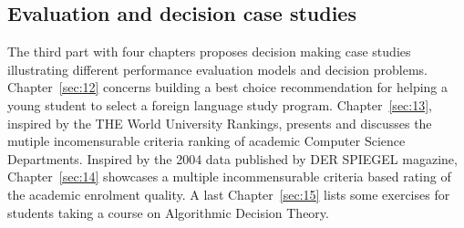 % 
%
%

\begin{partbacktext}
\part{Evaluation and decision case studies}
\noindent The third part with four chapters proposes decision making case studies illustrating different performance evaluation models and decision problems. Chapter~\ref{sec:12} concerns building a best choice recommendation for helping a young student to select a foreign language study program. Chapter~\ref{sec:13}, inspired by the THE World University Rankings, presents and discusses the mutiple incomensurable criteria ranking of academic Computer Science Departments. Inspired by the 2004 data published by DER SPIEGEL magazine, Chapter~\ref{sec:14} showcases a multiple incommensurable criteria based rating of the academic enrolment quality. A last Chapter~\ref{sec:15} lists some exercises for students taking a course on Algorithmic Decision Theory. 
\end{partbacktext}